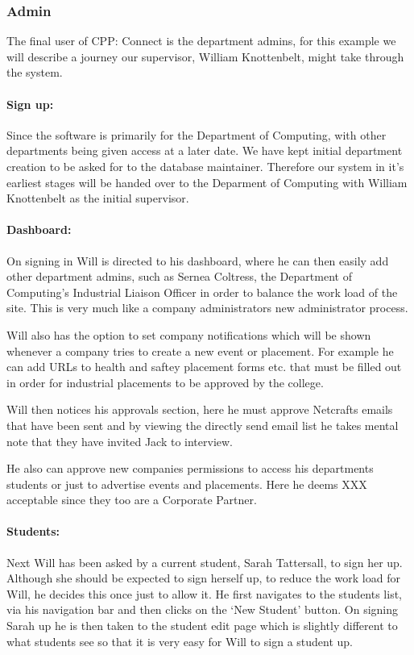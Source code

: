 \subsubsection{Admin}
  The final user of CPP: Connect is the department admins, for this example we will describe a journey our supervisor, William Knottenbelt, might take through the system.
  \paragraph{Sign up:}
    Since the software is primarily for the Department of Computing, with other departments being given access at a later date. We have kept initial department creation to be asked for to the database maintainer. 
    Therefore our system in it's earliest stages will be handed over to the Deparment of Computing with William Knottenbelt as the initial supervisor. 

  \paragraph{Dashboard:}
    On signing in Will is directed to his dashboard, where he can then easily add other department admins, such as Sernea Coltress, the Department of Computing's Industrial Liaison Officer in order to balance the work load of the site. This is very much like a company administrators new administrator process.


    Will also has the option to set company notifications which will be shown whenever a company tries to create a new event or placement. For example he can add URLs to health and saftey placement forms etc. that must be filled out in order for industrial placements to be approved by the college. 

    Will then notices his approvals section, here he must approve Netcrafts emails that have been sent and by viewing the directly send email list he takes mental note that they have invited Jack to interview. 

    He also can approve new companies permissions to access his departments students or just to advertise events and placements. Here he deems XXX acceptable since they too are a Corporate Partner.

  \paragraph{Students:}
    Next Will has been asked by a current student, Sarah Tattersall, to sign her up. Although she should be expected to sign herself up, to reduce the work load for Will, he decides this once just to allow it.
    He first navigates to the students list, via his navigation bar and then clicks on the `New Student' button.
    On signing Sarah up he is then taken to the student edit page which is slightly different to what students see so that it is very easy for Will to sign a student up.


